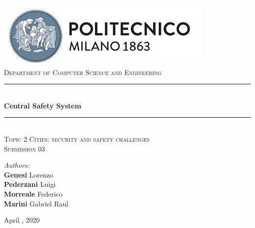 \documentclass[a4paper, hidelinks, 12pt]{report}
\begin{document}
    \begin{titlepage}
        \centering
        \vspace*{0.7 cm}
        \includegraphics[scale = 0.85]{assets/polimi.png}\\[1.6 cm]
        \textsc{\large Department of Computer Science and Engineering}\\[1.8 cm]

        \rule{\linewidth}{0.2 mm} \\[0.4 cm]
        { \huge \bfseries Central Safety System}\\
        \rule{\linewidth}{0.2 mm} \\[1.5 cm]

        \textsc{\large Topic 2 Cities: security and safety challenges}\\[0.5 cm]
        \textsc{\Large Submission 03}\\[1 cm]


        \begin{minipage}{1\textwidth}
            \begin{flushleft}
                \large
                \emph{Authors:}\\
                \textbf{Genesi} Lorenzo \\
                \textbf{Pederzani} Luigi \\
                \textbf{Morreale} Federico \\
                \textbf{Marini} Gabriel Raul \\
            \end{flushleft}
        \end{minipage}
        \newline
        \newline
        {\large April  , 2020}\\[1 cm]

        \vfill
    \end{titlepage}

    \tableofcontents
    \newpage
    \setcounter{page}{1}

    \newpage
    
\end{document}
